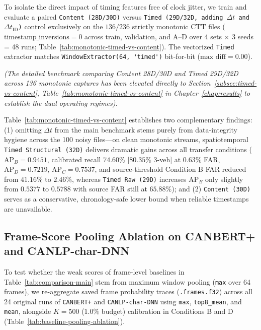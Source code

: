 \documentclass[12pt, a4paper, reqno, oneside]{book}
\DeclareRobustCommand{\code}[1]{\nolinkurl{#1}}
\begin{document}
To isolate the direct impact of timing features free of clock jitter, we train and evaluate a paired \code{Content (28D/30D)} versus \code{Timed (29D/32D, adding }$\Delta t$\code{ and }$\Delta t_{\text{ID}}$\code{)} control exclusively on the $136/236$ strictly monotonic CTT files ($\text{timestamp\_inversions}=0$ across train, validation, and A--D over 4 sets $\times$ 3 seeds = 48 runs; Table~\ref{tab:monotonic-timed-vs-content}). The vectorized \code{Timed} extractor matches \code{WindowExtractor(64, 'timed')} bit-for-bit ($\text{max diff}=0.00$).

{\footnotesize\setlength{\tabcolsep}{3.5pt}
{\small\setlength{\tabcolsep}{3.5pt}
\textit{(The detailed benchmark comparing Content 28D/30D and Timed 29D/32D across 136 monotonic captures has been elevated directly to Section~\ref{subsec:timed-vs-content}, Table~\ref{tab:monotonic-timed-vs-content} in Chapter~\ref{chap:results} to establish the dual operating regimes).}

Table~\ref{tab:monotonic-timed-vs-content} establishes two complementary findings: (1) omitting $\Delta t$ from the main benchmark stems purely from data-integrity hygiene across the 100 noisy files---on clean monotonic streams, spatiotemporal \code{Timed Structural (32D)} delivers dramatic gains across all transfer conditions ($\text{AP}_B=0.9451$, calibrated recall $74.60\%$ [$80.35\%$ 3-veh] at $0.63\%$ FAR, $\text{AP}_D=0.7219$, $\text{AP}_C=0.7537$, and source-threshold Condition B FAR reduced from $41.16\%$ to $2.46\%$, whereas \code{Timed Raw (29D)} increases $\text{AP}_B$ only slightly from $0.5377$ to $0.5788$ with source FAR still at $65.88\%$); and (2) \code{Content (30D)} serves as a conservative, chronology-safe lower bound when reliable timestamps are unavailable.

\subsection{Frame-Score Pooling Ablation on CANBERT+ and CANLP-char-DNN}\label{subsec:baseline-pooling-ablation}
To test whether the weak scores of frame-level baselines in Table~\ref{tab:comparison-main} stem from maximum window pooling (\code{max} over 64 frames), we re-aggregate saved frame probability traces (\code{.frames.f32}) across all 24 original runs of \code{CANBERT+} and \code{CANLP-char-DNN} using \code{max}, \code{top8\_mean}, and \code{mean}, alongside $K=500$ ($1.0\%$ budget) calibration in Conditions B and D (Table~\ref{tab:baseline-pooling-ablation}).

}}
\end{document}
